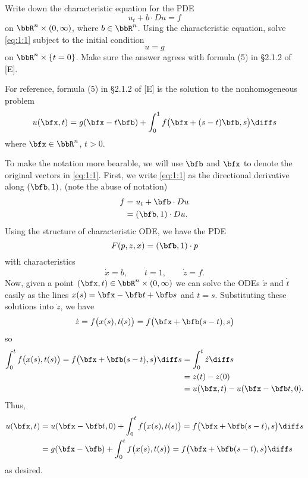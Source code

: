 \begin{problem}
  Write down the characteristic equation for the PDE
  \[
    \label{eq:1:1}
    \tag{\(*\)}
    u_t+b\cdot Du=f
  \]
  on \(\bbR^n\times(0,\infty)\), where \(b\in\bbR^n\). Using the
  characteristic equation, solve \eqref{eq:1:1} subject to the initial
  condition
  \[
    u=g
  \]
  on \(\bbR^n\times\{t=0\}\). Make sure the answer agrees with formula (5)
  in \S 2.1.2 of [E].
\end{problem}
\begin{solution}
  For reference, formula (5) in \S 2.1.2 of [E] is the solution to the
  nonhomogeneous problem
  \[
    u(\bfx,t)=g(\bfx-t\bfb)+\int_0^1 f\bigl(\bfx+(s-t)\bfb,s\bigr)\diff s
  \]
  where \(\bfx\in\bbR^n\), \(t>0\).

  To make the notation more bearable, we will use \(\bfb\) and \(\bfx\) to
  denote the original vectors in \eqref{eq:1:1}. First, we write
  \eqref{eq:1:1} as the directional derivative along \((\bfb,1)\), (note
  the abuse of notation)
  \begin{align*}
    f%
    &=u_t+\bfb\cdot Du\\
    &=(\bfb,1)\cdot Du.
  \end{align*}
  Using the structure of characteristic ODE, we have the PDE
  \[
    F(p,z,x)=(\bfb,1)\cdot p
  \]
  with characteristics
  \[
    \dot x=b,\qquad
    \dot t=1,\qquad
    \dot z=f.
  \]
  Now, given a point \((\bfx,t)\in\bbR^n\times(0,\infty)\) we can solve the
  ODEs \(\dot x\) and \(\dot t\) easily as the lines
  \(x(s)=\bfx-\bfb t+\bfb s\) and \(t=s\). Substituting these solutions
  into \(\dot z\), we have
  \[
    \dot z=f\bigl(x(s),t(s)\bigr)=f\bigl(\bfx+\bfb(s-t),s\bigr)
  \]
  so
  \begin{align*}
    \int_0^t f\bigl(x(s),t(s)\bigr)=f\bigl(\bfx+\bfb(s-t),s\bigr)\diff s
    &=\int_0^t \dot z\diff s\\
    &=z(t)-z(0)\\
    &= u(\bfx,t)-u(\bfx-\bfb t,0).
  \end{align*}
  Thus,
  \begin{align*}
    u(\bfx,t)
    &=u(\bfx-\bfb t,0)%
      +\int_0^t f\bigl(x(s),t(s)\bigr)=f\bigl(\bfx+\bfb(s-t),s\bigr)\diff
      s\\
    &=g(\bfx-\bfb)
      +\int_0^t f\bigl(x(s),t(s)\bigr)=f\bigl(\bfx+\bfb(s-t),s\bigr)\diff
      s
  \end{align*}
  as desired.
\end{solution}
\newpage

